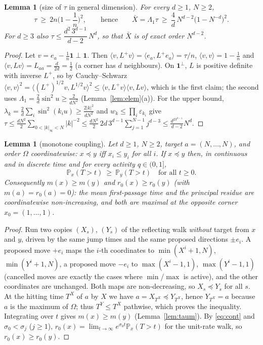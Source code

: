 \documentclass[11pt,a4paper]{article}
\newcommand{\one}{\mathbf 1}
\newcommand{\PP}{\mathbb P}
\newcommand{\ip}[2]{\langle #1,#2\rangle}
\newcommand{\Xb}{\bar X}
\theoremstyle{plain}
\newtheorem{lemma}[theorem]{Lemma}
\theoremstyle{definition}
\numberwithin{equation}{section}
\begin{document}
\begin{lemma}[size of $\tau$ in general dimension]\label{lem:taugen}
For every $d\ge1$, $N\ge2$,
\begin{equation}\label{eq:taulow}
\tau\ \ge\ 2n\Big(1-\frac1n\Big)^2,\qquad\text{hence}\qquad \Xb=\Lambda_1\tau\ \ge\ \frac4d\,N^{d-2}\big(1-N^{-d}\big)^2 .
\end{equation}
For $d\ge3$ also $\tau\le\dfrac{d^2\,3^{d-1}}{d-2}\,N^d$, so that $\Xb$ is of exact order $N^{d-2}$.
\end{lemma}
\begin{proof}
Let $v=e_a-\frac1n\one\perp\one$. Then $\ip v{L^+v}=\ip{e_a}{L^+e_a}=\tau/n$, $\ip vv=1-\frac1n$ and $\ip v{Lv}=L_{aa}=\frac{d}{2d}=\frac12$ (a corner has $d$ neighbours). On $\one^\perp$, $L$ is positive definite with inverse $L^+$, so by Cauchy--Schwarz $\ip vv^2=\ip{(L^+)^{1/2}v}{L^{1/2}v}^2\le\ip v{L^+v}\ip v{Lv}$, which is the first claim; the second uses $\Lambda_1=\frac2d\sin^2u\ge\frac{2}{dN^2}$ (Lemma~\ref{lem:elem}(a)). For the upper bound, $\lambda_k=\frac2d\sum_i\sin^2(k_iu)\ge\frac{2|k|^2}{dN^2}$ and $w_k\le\prod_i\varepsilon_{k_i}$ give $\tau\le\frac{dN^2}2\sum_{0<|k|_\infty<N}|k|^{-2}\le\frac{dN^2}{2}\,2d\,3^{d-1}\sum_{j=1}^{N-1}j^{d-3}\le\frac{d^23^{d-1}}{d-2}N^d$.
\end{proof}

\begin{lemma}[monotone coupling]\label{lem:coupling}
Let $d\ge1$, $N\ge2$, target $a=(N,\dots,N)$, and order $\Omega$ coordinatewise: $x\preceq y$ iff $x_i\le y_i$ for all $i$. If $x\preceq y$ then, in continuous and in discrete time and for every activity $q\in(0,1]$,
\[
\PP_x(T>t)\ \ge\ \PP_y(T>t)\quad\text{for all }t\ge0 .
\]
Consequently $m(x)\ge m(y)$ and $r_0(x)\ge r_0(y)$ (with $m(a)=r_0(a)=0$): the mean first-passage time and the principal residue are coordinatewise non-increasing, and both are maximal at the opposite corner $x_0=(1,\dots,1)$.
\end{lemma}
\begin{proof}
Run two copies $(X_s)$, $(Y_s)$ of the reflecting walk \emph{without} target from $x$ and $y$, driven by the same jump times and the same proposed directions $\pm e_i$. A proposed move $+e_i$ maps the $i$-th coordinates to $\min(X^i+1,N)$, $\min(Y^i+1,N)$, a proposed move $-e_i$ to $\max(X^i-1,1)$, $\max(Y^i-1,1)$ (cancelled moves are exactly the cases where $\min$/$\max$ is active), and the other coordinates are unchanged. Both maps are non-decreasing, so $X_s\preceq Y_s$ for all $s$. At the hitting time $T^X$ of $a$ by $X$ we have $a=X_{T^X}\preceq Y_{T^X}$, hence $Y_{T^X}=a$ because $a$ is the maximum of $\Omega$; thus $T^Y\le T^X$ pathwise, which proves the inequality. Integrating over $t$ gives $m(x)\ge m(y)$ (Lemma~\ref{lem:taum}). By \eqref{eq:cont} and $\sigma_0<\sigma_j$ ($j\ge1$), $r_0(x)=\lim_{t\to\infty}e^{\sigma_0t}\PP_x(T>t)$ for the unit-rate walk, so $r_0(x)\ge r_0(y)$.
\end{proof}
\end{document}
